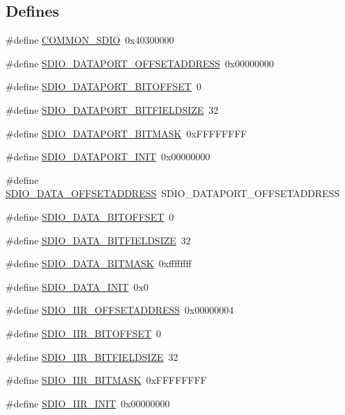 \subsection*{Defines}
\begin{DoxyCompactItemize}
\item 
\#define \hyperlink{a00571_a3248e44c75c99fdc1a2b553226866c1b}{COMMON\_\-SDIO}~0x40300000
\item 
\#define \hyperlink{a00571_a15ea759eff08d666d76dfcfe0c42981a}{SDIO\_\-DATAPORT\_\-OFFSETADDRESS}~0x00000000
\item 
\#define \hyperlink{a00571_aa999e039a0dd03a83ea852eeff9dece6}{SDIO\_\-DATAPORT\_\-BITOFFSET}~0
\item 
\#define \hyperlink{a00571_a24b5d10f11df4079f02e98bb772166c5}{SDIO\_\-DATAPORT\_\-BITFIELDSIZE}~32
\item 
\#define \hyperlink{a00571_a461df4f4c6cf282d2ae7e4b4dd623ed3}{SDIO\_\-DATAPORT\_\-BITMASK}~0xFFFFFFFF
\item 
\#define \hyperlink{a00571_ace16f4316e53ccf8aa655facd776bb97}{SDIO\_\-DATAPORT\_\-INIT}~0x00000000
\item 
\#define \hyperlink{a00571_a40a21fed57b5ab66c124fb3dc0792aea}{SDIO\_\-DATA\_\-OFFSETADDRESS}~SDIO\_\-DATAPORT\_\-OFFSETADDRESS
\item 
\#define \hyperlink{a00571_a24306f5b8565ed6369781cac37162ee5}{SDIO\_\-DATA\_\-BITOFFSET}~0
\item 
\#define \hyperlink{a00571_a314aeb6793cc136ea890cbe2064266e1}{SDIO\_\-DATA\_\-BITFIELDSIZE}~32
\item 
\#define \hyperlink{a00571_ad6b7b9a59cf2699cd3a236cdbb5881d9}{SDIO\_\-DATA\_\-BITMASK}~0xffffffff
\item 
\#define \hyperlink{a00571_a398fe045c17dac59478629be7e393ac5}{SDIO\_\-DATA\_\-INIT}~0x0
\item 
\#define \hyperlink{a00571_abb22a967669ed49c87ecbb70f93e020a}{SDIO\_\-IIR\_\-OFFSETADDRESS}~0x00000004
\item 
\#define \hyperlink{a00571_a20a50a6efa21d215083db74b0e2b6b6a}{SDIO\_\-IIR\_\-BITOFFSET}~0
\item 
\#define \hyperlink{a00571_ad52466c2114460b5ba385eb4bb4d6992}{SDIO\_\-IIR\_\-BITFIELDSIZE}~32
\item 
\#define \hyperlink{a00571_ad0600802205634236f406597a6f1aec9}{SDIO\_\-IIR\_\-BITMASK}~0xFFFFFFFF
\item 
\#define \hyperlink{a00571_a666f39222dcd522ed63dfb38a806b8a1}{SDIO\_\-IIR\_\-INIT}~0x00000000
\item 

\end{DoxyCompactItemize}
